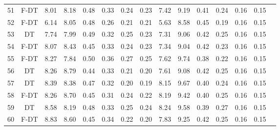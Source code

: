 \begin{longtable}{@{\hskip3pt}c@{\hskip3pt}c@{\hskip3pt}c@{\hskip3pt}c@{\hskip3pt}c@{\hskip3pt}c@{\hskip3pt}c@{\hskip3pt}c@{\hskip3pt}c@{\hskip3pt}c@{\hskip3pt}c@{\hskip3pt}c@{\hskip3pt}c@{\hskip3pt}c@{\hskip3pt}c}
         51 &           F-DT &              8.01 &        8.18 &          0.48 &        0.33 &        0.24 &         0.23 &                7.42 &        9.19 &          0.41 &        0.24 &        0.16 &         0.15 \\
         52 &           F-DT &              6.14 &        8.05 &          0.48 &        0.26 &        0.21 &         0.21 &                5.63 &        8.58 &          0.45 &        0.19 &        0.16 &         0.15 \\
         53 &             DT &              7.74 &        7.99 &          0.49 &        0.32 &        0.25 &         0.23 &                7.31 &        9.06 &          0.42 &        0.25 &        0.16 &         0.15 \\
         54 &           F-DT &              8.07 &        8.43 &          0.45 &        0.33 &        0.24 &         0.23 &                7.34 &        9.04 &          0.42 &        0.23 &        0.16 &         0.15 \\
         55 &           F-DT &              8.27 &        7.84 &          0.50 &        0.36 &        0.27 &         0.25 &                7.62 &        9.74 &          0.38 &        0.22 &        0.16 &         0.15 \\
         56 &             DT &              8.26 &        8.79 &          0.44 &        0.33 &        0.21 &         0.20 &                7.61 &        9.08 &          0.42 &        0.25 &        0.16 &         0.15 \\
         57 &             DT &              8.39 &        8.38 &          0.47 &        0.32 &        0.20 &         0.19 &                8.15 &        9.67 &          0.40 &        0.24 &        0.16 &         0.15 \\
         58 &           F-DT &              8.26 &        8.70 &          0.45 &        0.31 &        0.24 &         0.22 &                8.19 &        9.42 &          0.40 &        0.25 &        0.16 &         0.15 \\
         59 &             DT &              8.58 &        8.19 &          0.48 &        0.33 &        0.25 &         0.24 &                8.24 &        9.58 &          0.39 &        0.27 &        0.16 &         0.15 \\
         60 &           F-DT &              8.83 &        8.60 &          0.45 &        0.34 &        0.22 &         0.20 &                7.83 &        9.25 &          0.42 &        0.25 &        0.16 &         0.15 \\

\end{longtable}
